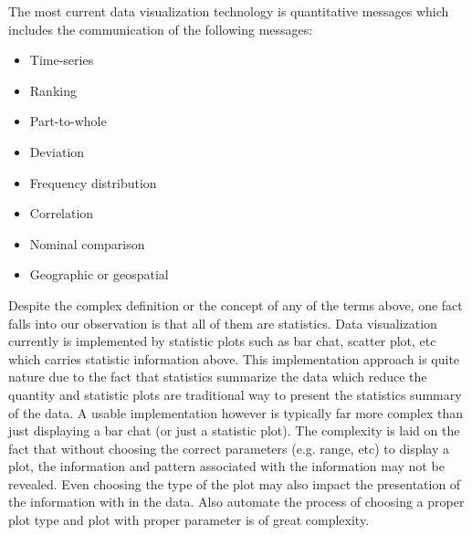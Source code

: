 \documentclass[12pt]{article}
\begin{document}
\begin{flushleft}
The most current data visualization technology is quantitative messages which includes the communication of the following messages\cite{emmm}:
\begin{singlespace}
\begin{itemize}
	\item Time-series
	\item Ranking
	\item Part-to-whole
	\item Deviation
	\item Frequency distribution
	\item Correlation
	\item Nominal comparison
	\item Geographic or geospatial
\end{itemize}
\end{singlespace}
Despite the complex definition or the concept of any of the terms above, one fact falls into our observation is that all of them are statistics. Data visualization currently is implemented by statistic plots such as bar chat, scatter plot, etc which carries statistic information above. This implementation approach is quite nature due to the fact that statistics summarize the data which reduce the quantity and statistic plots are traditional way to present the statistics summary of the data. A usable implementation however is typically far more complex than just displaying a bar chat (or just a statistic plot). The complexity is laid on the fact that without choosing the correct parameters (e.g. range, etc) to display a plot, the information and pattern associated with the information may not be revealed. Even choosing the type of the plot may also impact the presentation of the information with in the data. Also automate the process of choosing a proper plot type and plot with proper parameter is of great complexity.


\end{flushleft}
\end{document}

